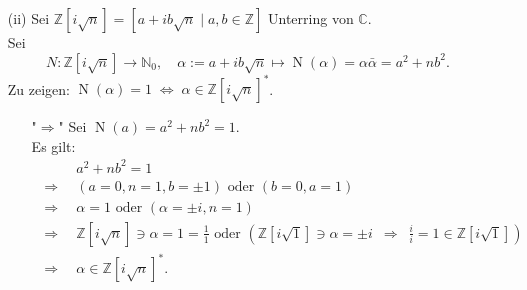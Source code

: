 \documentclass[12pt]{article}
\newcommand{\df}{\enspace\Longrightarrow\enspace}
\newcommand{\N}{\operatorname{N}}
\newcommand{\gdw}{\;\Longleftrightarrow\;}
\begin{document}
\begin{enumerate}
\begin{enumerate}
		\item[(ii)] Sei $\mathbb{Z}[i\sqrt{n}]=\left\lbrack a+ib\sqrt{n}\mid a,b\in\mathbb{Z}\right\rbrack$ Unterring von $\mathbb{C}$. \\
		Sei $$N:\mathbb{Z}[i\sqrt{n}]\rightarrow\mathbb{N}_0, \quad
		\alpha:=a+ib\sqrt{n}\mapsto \N(\alpha)=\alpha\bar{\alpha}=a^2+nb^2.$$
		Zu zeigen: $\N(\alpha)=1\gdw\alpha\in\mathbb{Z}[i\sqrt{n}]^*$.
		\begin{enumerate}
			\item["$\Rightarrow$"] Sei $\N(a)=a^2+nb^2=1$. \\
			Es gilt:
			\begin{align*}
				&a^2+nb^2=1 \\
				\df &(a=0, n=1, b=\pm 1)\text{ oder }(b=0, a=1) \\
				\df &\alpha=1\text{ oder }(\alpha=\pm i,n=1) \\
				\df &\mathbb{Z}[i\sqrt{n}]\ni\alpha=1=\frac{1}{1}\text{ oder }\left(\mathbb{Z}[i\sqrt{1}]\ni\alpha=\pm i\df\frac{i}{i}=1\in\mathbb{Z}[i\sqrt{1}]\right) \\
				\df &\alpha\in\mathbb{Z}[i\sqrt{n}]^*.
			\end{align*}
			

\end{enumerate}
\end{enumerate}
\end{enumerate}
\end{document}
